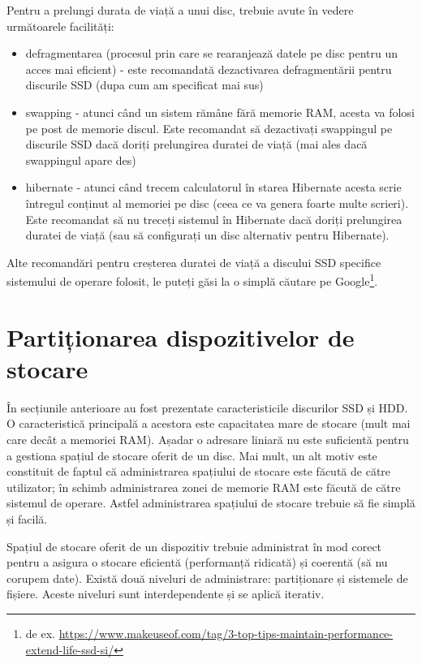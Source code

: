 Pentru a prelungi durata de viață a unui disc, trebuie avute
în vedere următoarele facilități:

\begin{itemize}
	\item defragmentarea (procesul prin care se rearanjează datele pe disc
		pentru un acces mai eficient) - este recomandată dezactivarea
		defragmentării pentru discurile SSD (dupa cum am specificat mai
		sus)
	\item swapping - atunci când un sistem rămâne fără memorie RAM, acesta
		va folosi pe post de memorie discul. Este recomandat să
		dezactivați swappingul pe discurile SSD dacă doriți prelungirea
		duratei de viață (mai ales dacă swappingul apare des)
	\item hibernate - atunci când trecem calculatorul în starea Hibernate
		acesta scrie întregul conținut al memoriei pe disc (ceea ce va
		genera foarte multe scrieri). Este recomandat să nu treceți
		sistemul în Hibernate dacă doriți prelungirea duratei de viață
		(sau să configurați un disc alternativ pentru Hibernate).
\end{itemize}

Alte recomandări pentru creșterea duratei de viață a discului SSD specifice
sistemului de operare folosit, le puteți găsi la o simplă căutare pe Google\footnote{de ex. \url{https://www.makeuseof.com/tag/3-top-tips-maintain-performance-extend-life-ssd-si/}}.

\section{Partiționarea dispozitivelor de stocare}
\label{sec:storage:partition}

În secțiunile anterioare au fost prezentate caracteristicile discurilor
SSD și HDD. O caracteristică principală a acestora este capacitatea mare de
stocare (mult mai care decât a memoriei RAM). Așadar o adresare liniară nu este
suficientă pentru a gestiona spațiul de stocare oferit de un disc. Mai mult, un
alt motiv este constituit de faptul că administrarea spațiului de stocare este
făcută de către utilizator; în schimb administrarea zonei de memorie RAM este
făcută de către sistemul de operare. Astfel administrarea spațiului de stocare
trebuie să fie simplă și facilă.

Spațiul de stocare oferit de un dispozitiv trebuie administrat în mod corect
pentru a asigura o stocare eficientă (performanță ridicată) și coerentă (să nu
corupem date). Există două niveluri de administrare: partiționare și sistemele de
fișiere. Aceste niveluri sunt interdependente și se aplică iterativ.

